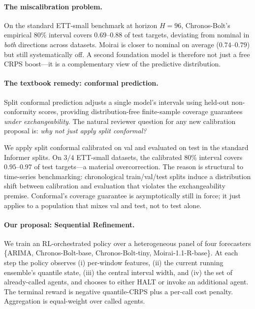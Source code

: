 \documentclass{article}
\begin{document}
\paragraph{The miscalibration problem.}
On the standard ETT-small benchmark at horizon $H=96$, Chronos-Bolt's
empirical 80\% interval covers $0.69$--$0.88$ of test targets, deviating
from nominal in \emph{both} directions across datasets. Moirai is closer
to nominal on average ($0.74$--$0.79$) but still systematically off.
A second foundation model is therefore not just a free CRPS boost---it
is a complementary view of the predictive distribution.

\paragraph{The textbook remedy: conformal prediction.}
Split conformal prediction \cite{vovk2005algorithmic,romano2019cqr} adjusts
a single model's intervals using held-out non-conformity scores, providing
distribution-free finite-sample coverage guarantees \emph{under
exchangeability}. The natural reviewer question for any new calibration
proposal is: \emph{why not just apply split conformal?}

We apply split conformal calibrated on val and evaluated on test in the
standard Informer splits. On $3/4$ ETT-small datasets, the calibrated
80\% interval covers $0.95$--$0.97$ of test targets---a material
overcorrection. The reason is structural to time-series benchmarking:
chronological train/val/test splits induce a distribution shift between
calibration and evaluation that violates the exchangeability premise.
Conformal's coverage guarantee is asymptotically still in force; it just
applies to a population that mixes val and test, not to test alone.

\paragraph{Our proposal: Sequential Refinement.}
We train an RL-orchestrated policy over a heterogeneous panel of four
forecasters \{ARIMA, Chronos-Bolt-base, Chronos-Bolt-tiny, Moirai-1.1-R-base\}.
At each step the policy observes (i) per-window features, (ii) the current
running ensemble's quantile state, (iii) the central interval width, and
(iv) the set of already-called agents, and chooses to either HALT or invoke
an additional agent. The terminal reward is negative quantile-CRPS plus a
per-call cost penalty. Aggregation is equal-weight over called agents.
\end{document}
